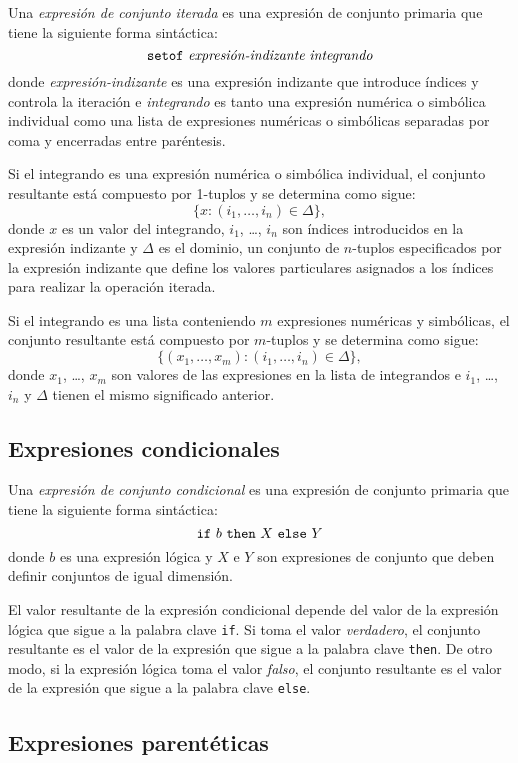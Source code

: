 \documentclass[11pt,spanish]{report}
\begin{document}
Una {\it expresión de conjunto iterada} es una expresión de conjunto primaria que tiene la siguiente forma sintáctica:
$$\mbox{{\tt setof} {\it expresión-indizante} {\it integrando}}$$
donde {\it expresión-indizante} es una expresión indizante  que introduce índices y controla la iteración e {\it integrando} es tanto una expresión numérica o simbólica individual como una lista de expresiones numéricas o simbólicas separadas por coma y encerradas entre paréntesis.

Si el integrando es una expresión numérica o simbólica individual, el conjunto resultante está compuesto por 1-tuplos y se determina como sigue:
$$\{x:(i_1,\dots,i_n)\in\Delta\},$$
\noindent donde $x$ es un valor del integrando, $i_1$, \dots, $i_n$ son índices introducidos en la expresión indizante y $\Delta$ es el dominio, un conjunto de $n$-tuplos especificados por la expresión indizante que define los valores particulares asignados a los índices para realizar la operación iterada.

Si el integrando es una lista conteniendo $m$ expresiones numéricas y simbólicas, el conjunto resultante está compuesto por $m$-tuplos y se determina como sigue:
$$\{(x_1,\dots,x_m):(i_1,\dots,i_n)\in\Delta\},$$
donde $x_1$, \dots, $x_m$ son valores de las expresiones en la lista de integrandos e $i_1$, \dots, $i_n$ y $\Delta$ tienen el mismo significado anterior.

\subsection{Expresiones condicionales}

Una {\it expresión de conjunto condicional} es una expresión de conjunto primaria que tiene la siguiente forma sintáctica:
$$\mbox{{\tt if} $b$ {\tt then} $X$ {\tt else} $Y$}$$
donde $b$ es una expresión lógica y $X$ e $Y$ son expresiones de conjunto que deben definir conjuntos de igual dimensión.

El valor resultante de la expresión condicional depende del valor de la expresión lógica que sigue a la palabra clave {\tt if}. Si toma el valor {\it verdadero}, el conjunto resultante es el valor de la expresión que sigue a la palabra clave {\tt then}. De otro modo, si la expresión lógica toma el valor {\it falso}, el conjunto resultante es el valor de la expresión que sigue a la palabra clave {\tt else}.

\subsection{Expresiones parentéticas}
\end{document}
